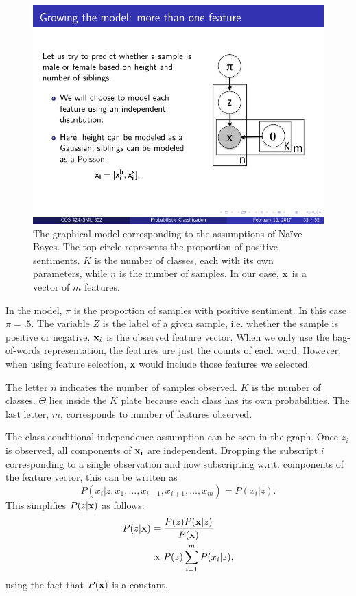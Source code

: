 \documentclass{article} %
\begin{document}
	\begin{figure}[h]
		\centering
		\includegraphics[scale=1]{DAG}
		\caption{The graphical model corresponding to the assumptions of Na\"ive Bayes. The top circle represents the proportion of positive sentiments. $K$ is the number of classes, each with its own parameters, while $n$ is the number of samples. In our case, $\bf x$ is a vector of $m$ features.}
		\label{fig:dag}
	\end{figure}
	
	In the model, $\pi$ is the proportion of samples with positive sentiment. In this case $\pi = .5$. The variable $Z$ is the label of a given sample, i.e. whether the sample is positive or negative. ${\bf x}_i$ is the observed feature vector. When we only use the bag-of-words representation, the features are just the counts of each word. However, when using feature selection, {\bf x} would include those features we selected.
	
	The letter $n$ indicates the number of samples observed. $K$ is the number of classes. $\Theta$ lies inside the $K$ plate because each class has its own probabilities. The last letter, $m$, corresponds to number of features observed. 
	
	The class-conditional independence assumption can be seen in the graph. Once $z_i$ is observed, all components of $\bf x_i$ are independent. Dropping the subscript $i$ corresponding to a single observation and now subscripting w.r.t. components of the feature vector, this can be written as 
	\begin{equation}
	P(x_i|z, x_1,\dots,x_{i-1}, x_{i+1}, \dots, x_m) = P(x_i|z).
	\end{equation}
	This simplifies $P(z|{\bf x})$ as follows:
	\begin{align}
	P(z|{\bf x}) &= \frac{P(z)P({\bf x}|z)}{P({\bf x})} \nonumber\\
	&\propto P(z)\sum_{i=1}^mP(x_i|z), \label{eqn:pzx}
	\end{align}
	using the fact that $P({\bf x})$ is a constant.
	
\end{document}

